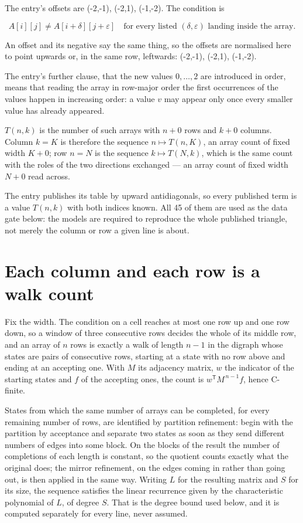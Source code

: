 \documentclass[11pt]{article}
\theoremstyle{definition}
\begin{document}
The entry's offsets are (-2,-1), (-2,1), (-1,-2). The condition is

\[A[i][j] \ne A[i{+}\delta][j{+}\varepsilon]\quad\text{for every listed }(\delta,\varepsilon)\text{ landing inside the array.}\]

An offset and its negative say the same thing, so the offsets are normalised here to point upwards or, in the same row, leftwards: (-2,-1), (-2,1), (-1,-2).

The entry's further clause, that the new values $0,\dots,2$ are introduced in order, means that reading the array in row-major order the first occurrences of the values happen in increasing order: a value $v$ may appear only once every smaller value has already appeared.

$T(n,k)$ is the number of such arrays with $n + 0$ rows and $k + 0$ columns. Column $k = K$ is therefore the sequence $n \mapsto T(n,K)$, an array count of fixed width $K + 0$; row $n = N$ is the sequence $k \mapsto T(N,k)$, which is the same count with the roles of the two directions exchanged --- an array count of fixed width $N + 0$ read across.

The entry publishes its table by upward antidiagonals, so every published term is a value $T(n,k)$ with both indices known. All 45 of them are used as the data gate below: the models are required to reproduce the whole published triangle, not merely the column or row a given line is about.

\section{Each column and each row is a walk count}

Fix the width. The condition on a cell reaches at most one row up and one row down, so a window of three consecutive rows decides the whole of its middle row, and an array of $n$ rows is exactly a walk of length $n-1$ in the digraph whose states are pairs of consecutive rows, starting at a state with no row above and ending at an accepting one. With $M$ its adjacency matrix, $w$ the indicator of the starting states and $f$ of the accepting ones, the count is $w^{\mathsf T}M^{\,n-1}f$, hence C-finite.

States from which the same number of arrays can be completed, for every remaining number of rows, are identified by partition refinement: begin with the partition by acceptance and separate two states as soon as they send different numbers of edges into some block. On the blocks of the result the number of completions of each length is constant, so the quotient counts exactly what the original does; the mirror refinement, on the edges coming in rather than going out, is then applied in the same way. Writing $L$ for the resulting matrix and $S$ for its size, the sequence satisfies the linear recurrence given by the characteristic polynomial of $L$, of degree $S$. That is the degree bound used below, and it is computed separately for every line, never assumed.
\end{document}
